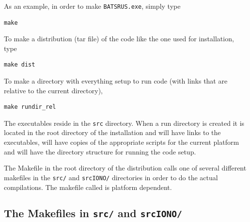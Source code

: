 \noindent
As an example, in order to make {\tt BATSRUS.exe}, simply type 
\begin{verbatim}
make
\end{verbatim}
To make a distribution (tar file) of the code like the one used for installation,  type
\begin{verbatim}
make dist
\end{verbatim}
To make a directory with everything setup to run code (with links
that are relative to the current directory), 
\begin{verbatim}
make rundir_rel
\end{verbatim}
The executables reside in the {\tt src} directory.  When a run
directory is created it is located in the root directory of the
installation and will have links to the executables, will have copies of
the appropriate scripts for the current platform and will have the
directory structure for running the code setup.

The Makefile in the root directory of the distribution calls one of several
different makefiles in the  {\tt src/} and {\tt srcIONO/} directories
in order to do the
actual compilations.  The makefile called is platform dependent.

\subsection{The Makefiles in {\tt src/} and {\tt srcIONO/} \label{section:src_make}}

